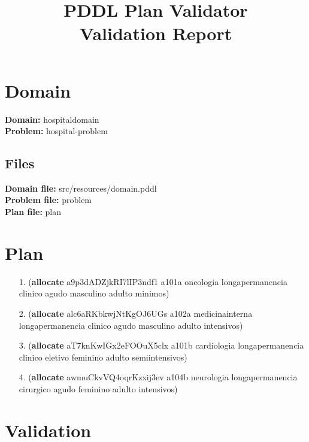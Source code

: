 \documentclass{article}
\title{\textbf{PDDL Plan Validator}\\Validation Report}
\date{} %
\begin{document}
\maketitle

\section{Domain}
\textbf{Domain:}  hospitaldomain\\
\textbf{Problem:} hospital-problem

\subsection{Files}
\textbf{Domain file:}  src/resources/domain.pddl \\
\textbf{Problem file:} problem\\
\textbf{Plan file:}    plan

\section{Plan}

\begin{itemize}
    \item[1.] (\textbf{allocate} a9p3dADZjkRI7lIP3ndf1 a101a oncologia longapermanencia clinico agudo masculino adulto minimos)
    \item[2.] (\textbf{allocate} alc6aRKbkwjNtKgOJ6UGs a102a medicinainterna longapermanencia clinico agudo masculino adulto intensivos)
    \item[3.] (\textbf{allocate} aT7knKwIGx2eFOOuX5clx a101b cardiologia longapermanencia clinico eletivo feminino adulto semiintensivos)
    \item[4.] (\textbf{allocate} awmuCkvVQ4oqrKzxij3ev a104b neurologia longapermanencia cirurgico agudo feminino adulto intensivos)
\end{itemize}

\section{Validation}
\end{document}
